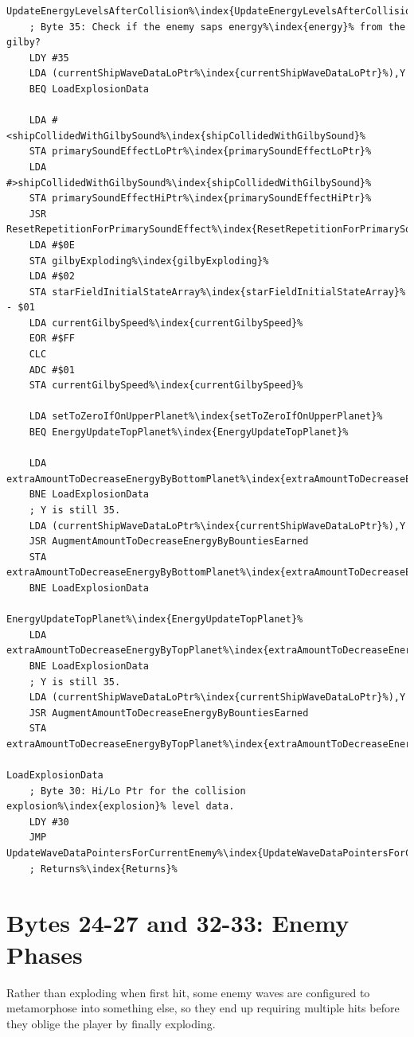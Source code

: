 \begin{lstlisting}[escapechar=\%]
UpdateEnergyLevelsAfterCollision%\index{UpdateEnergyLevelsAfterCollision}%
    ; Byte 35: Check if the enemy saps energy%\index{energy}% from the gilby?
    LDY #35
    LDA (currentShipWaveDataLoPtr%\index{currentShipWaveDataLoPtr}%),Y
    BEQ LoadExplosionData

    LDA #<shipCollidedWithGilbySound%\index{shipCollidedWithGilbySound}%
    STA primarySoundEffectLoPtr%\index{primarySoundEffectLoPtr}%
    LDA #>shipCollidedWithGilbySound%\index{shipCollidedWithGilbySound}%
    STA primarySoundEffectHiPtr%\index{primarySoundEffectHiPtr}%
    JSR ResetRepetitionForPrimarySoundEffect%\index{ResetRepetitionForPrimarySoundEffect}%
    LDA #$0E
    STA gilbyExploding%\index{gilbyExploding}%
    LDA #$02
    STA starFieldInitialStateArray%\index{starFieldInitialStateArray}% - $01
    LDA currentGilbySpeed%\index{currentGilbySpeed}%
    EOR #$FF
    CLC
    ADC #$01
    STA currentGilbySpeed%\index{currentGilbySpeed}%

    LDA setToZeroIfOnUpperPlanet%\index{setToZeroIfOnUpperPlanet}%
    BEQ EnergyUpdateTopPlanet%\index{EnergyUpdateTopPlanet}%

    LDA extraAmountToDecreaseEnergyByBottomPlanet%\index{extraAmountToDecreaseEnergyByBottomPlanet}%
    BNE LoadExplosionData
    ; Y is still 35.
    LDA (currentShipWaveDataLoPtr%\index{currentShipWaveDataLoPtr}%),Y
    JSR AugmentAmountToDecreaseEnergyByBountiesEarned
    STA extraAmountToDecreaseEnergyByBottomPlanet%\index{extraAmountToDecreaseEnergyByBottomPlanet}%
    BNE LoadExplosionData

EnergyUpdateTopPlanet%\index{EnergyUpdateTopPlanet}%   
    LDA extraAmountToDecreaseEnergyByTopPlanet%\index{extraAmountToDecreaseEnergyByTopPlanet}%
    BNE LoadExplosionData
    ; Y is still 35.
    LDA (currentShipWaveDataLoPtr%\index{currentShipWaveDataLoPtr}%),Y
    JSR AugmentAmountToDecreaseEnergyByBountiesEarned
    STA extraAmountToDecreaseEnergyByTopPlanet%\index{extraAmountToDecreaseEnergyByTopPlanet}%

LoadExplosionData
    ; Byte 30: Hi/Lo Ptr for the collision explosion%\index{explosion}% level data.
    LDY #30
    JMP UpdateWaveDataPointersForCurrentEnemy%\index{UpdateWaveDataPointersForCurrentEnemy}%
    ; Returns%\index{Returns}%
\end{lstlisting}

\section{Bytes 24-27 and 32-33: Enemy Phases}
Rather than exploding when first hit, some enemy waves are configured to metamorphose into something else, so they 
end up requiring multiple hits before they oblige the player by finally exploding.

